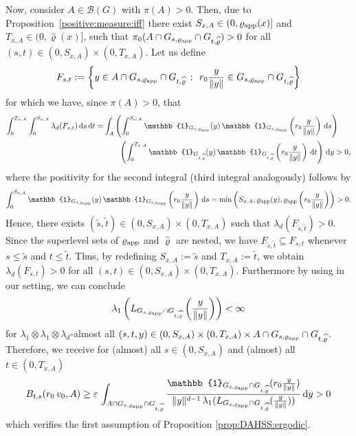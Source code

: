 \documentclass[sn-mathphys-num]{sn-jnl}%
\theoremstyle{thmstyleone}%
\theoremstyle{thmstyletwo}%
\theoremstyle{thmstylethree}%
\newcommand{\rhoapp}{\varrho_{{\rm app}}}
\newcommand{\rhohat}{\widehat{\varrho}}
\newcommand{\change}[1]{\bgroup\color{black}#1\egroup}    %
\begin{document}
\begin{appendices}
    \change{Now, consider $A\in\mathcal B(G)$ with $\pi(A)>0$.} Then, due to Proposition~\ref{positive:measure:iff} there exist $S_{x,A}\in(0, \rhoapp(x)]$ and $T_{x,A}\in(0, \widehat{\varrho}(x)]$, such that $\pi_0(A\cap G_{s, \varrho_{\textmd{app}}}\cap G_{t, \widehat{\varrho}}) > 0$ for all $(s,t)\in(0, S_{x,A})\times(0, T_{x,A})$. 
    Let us define
    \begin{align*}
        F_\change{{s,t}}
        :=
        \left\{y \in A \cap G_{s,\varrho_{\textmd{app}}}\cap G_{t,\widehat{\varrho}} \ \colon \ r_0\frac{y}{\|y\|} \in G_{s,\varrho_{\textmd{app}}}\cap G_{t,\widehat{\varrho}} 
        \right\} 
    \end{align*}
    \change{for which we have, since $\pi(A)>0$, that}
    \begin{align*}
        \int^{T_{x,A}}_0 \int^{S_{x,A}}_0 \lambda_d(F_\change{{s,t}}) \, \mathrm{d}s \, \mathrm{d}t = &\int_A \left(\int^{S_{x,A}}_0 \mathbb{1}_{G_{s,\varrho_{\textmd{app}}}}(y) \, \mathbb{1}_{G_{s,\varrho_{\textmd{app}}}}\left(r_0\frac{y}{\|y\|}\right) \, \mathrm{d}s\right) \\ 
        & \qquad \left(\int^{T_{x,A}}_0 \mathbb{1}_{G_{t, \widehat{\varrho}}}(y) \, \mathbb{1}_{G_{t, \widehat{\varrho}}}\left(r_0\frac{y}{\|y\|}\right) \, \mathrm{d}t\right) \, \mathrm{d}y >0,
    \end{align*}
    where the positivity for the second integral (third integral analogously) follows by 
    \begin{align*}
      \int^{S_{x,A}}_0 \mathbb{1}_{G_{s,\varrho_{\textmd{app}}}}(y) \, \mathbb{1}_{G_{s,\varrho_{\textmd{app}}}}\left(r_0\frac{y}{\|y\|}\right) \, \mathrm{d}s = \min\left(S_{x,A}, \rhoapp(y), \rhoapp\left(r_0\frac{y}{\|y\|}\right)\right) >0.     
    \end{align*}
    \change{Hence, there exists $(\tilde{s},\tilde{t})\in(0,S_{x,A})\times(0,T_{x,A})$ such that
    $\lambda_d(F_{\tilde{s},\tilde{t}})>0$. 
    Since the superlevel sets of $\rhoapp$ and $\rhohat$ are nested, we have $F_{\tilde{s},\tilde{t}}\subseteq F_{s,t}$ whenever $s\leq \tilde{s}$ and $t\leq \tilde{t}$. Thus, by redefining $S_{x,A} := \tilde s$ and $T_{x,A}:= \tilde t$, we obtain $\lambda_d(F_{s,t})>0$ for all
    $(s,t)\in(0,S_{x,A})\times(0,T_{x,A})$.} Furthermore by using \cite[Lemma~\change{B}.4]{SchaerEtAl2023} in our setting, we can conclude 
    \[
    \lambda_1\left(L_{G_{s,\varrho_{\textmd{app}}}\cap G_{t,\widehat{\varrho}}}\left(\frac{y}{\|y\|}\right)\right)<\infty
    \] 
    for $\lambda_1\otimes\lambda_1\otimes \lambda_d$-almost all $(s,t, y)\in(0, S_{x,A})\times (0, T_{x,A}) \times A \cap G_{s,\varrho_{\textmd{app}}}\cap G_{t,\widehat{\varrho}}$.
    Therefore, we receive for (almost) all $s\in(0, S_{x,A})$ and (almost) all $t\in(0, T_{x,A})$  
    \[
    B_{t,s}(r_0\, v_0, A)\geq \varepsilon \, \int_{A \cap G_{s,\varrho_{\textmd{app}}}\cap G_{t,\widehat{\varrho}}} \frac{\mathbb{1}_{G_{s,\varrho_{\textmd{app}}}\cap G_{t,\widehat{\varrho}}}(r_0\frac{y}{\|y\|})}{\|y\|^{d-1} \, \lambda_1(L_{G_{s,\varrho_{\textmd{app}}}\cap G_{t,\widehat{\varrho}}}(\frac{y}{\|y\|}))} \, \mathrm{d}y >0 
    \]
    \change{which verifies the first assumption of Proposition \ref{prop:DAHSS:ergodic}.}


\end{appendices}
\end{document}
